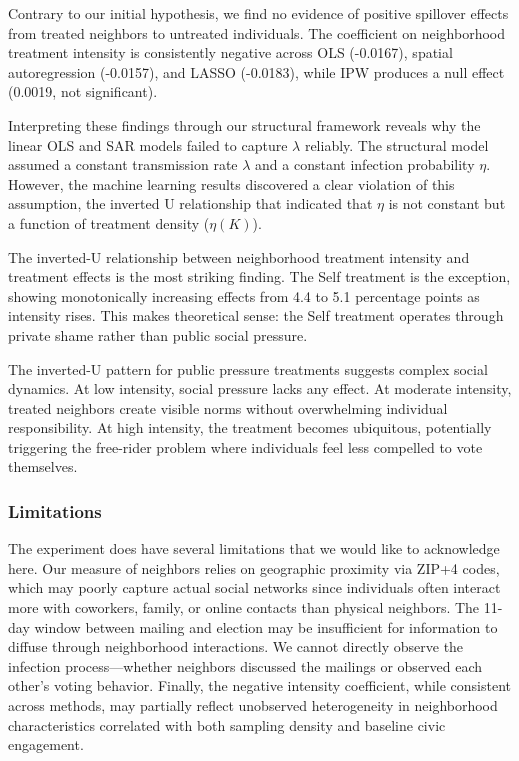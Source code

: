 \documentclass[11pt]{article}
\begin{document}
Contrary to our initial hypothesis, we find no evidence of positive spillover effects from treated neighbors to untreated individuals. The coefficient on neighborhood treatment intensity is consistently negative across OLS (-0.0167), spatial autoregression (-0.0157), and LASSO (-0.0183), while IPW produces a null effect (0.0019, not significant). 

Interpreting these findings through our structural framework reveals why the linear OLS and SAR models failed to capture $\lambda$ reliably. The structural model assumed a constant transmission rate $\lambda$ and a constant infection probability $\eta$. However, the machine learning results discovered a clear violation of this assumption, the inverted U relationship that indicated that $\eta$ is not constant but a function of treatment density ($\eta(K)$).

The inverted-U relationship between neighborhood treatment intensity and treatment effects is the most striking finding. The Self treatment is the exception, showing monotonically increasing effects from 4.4 to 5.1 percentage points as intensity rises. This makes theoretical sense: the Self treatment operates through private shame rather than public social pressure.

The inverted-U pattern for public pressure treatments suggests complex social dynamics. At low intensity, social pressure lacks any effect. At moderate intensity, treated neighbors create visible norms without overwhelming individual responsibility. At high intensity, the treatment becomes ubiquitous, potentially triggering the free-rider problem where individuals feel less compelled to vote themselves.

\subsubsection{Limitations}

The experiment does have several limitations that we would like to acknowledge here. Our measure of neighbors relies on geographic proximity via ZIP+4 codes, which may poorly capture actual social networks since individuals often interact more with coworkers, family, or online contacts than physical neighbors. The 11-day window between mailing and election may be insufficient for information to diffuse through neighborhood interactions. We cannot directly observe the infection process---whether neighbors discussed the mailings or observed each other's voting behavior. Finally, the negative intensity coefficient, while consistent across methods, may partially reflect unobserved heterogeneity in neighborhood characteristics correlated with both sampling density and baseline civic engagement.
\end{document}
